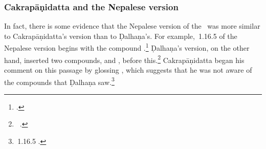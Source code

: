 


 
\subsubsection{Cakrapāṇidatta and the Nepalese version}
In fact, there is some evidence that the Nepalese version of the \SS\ was more
similar to Cakrapāṇidatta's version than to Ḍalhaṇa's. For example, \SS\,1.16.5 of
the Nepalese version begins with the compound
.\footcite[126]{acar-1939} Ḍalhaṇa's version, on the other
hand,  inserted two compounds,  and
, before this.\footnote{\SS\ .} Cakrapāṇidatta
began his comment on this passage by glossing , which
suggests that he was not aware of the compounds that Ḍalhaṇa
saw.\footnote{\SS\,1.16.5 \citep[126–127]{acar-1939}.}

